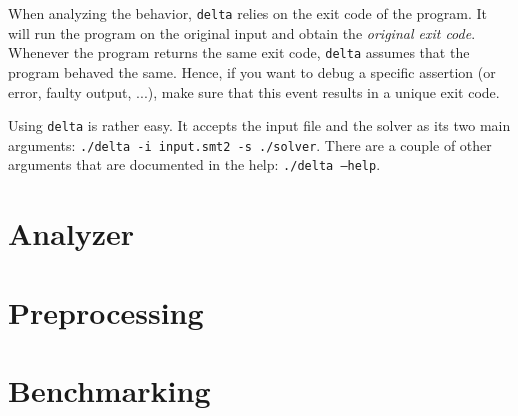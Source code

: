 When analyzing the behavior, \texttt{delta} relies on the exit code of the program.
It will run the program on the original input and obtain the \emph{original exit code}.
Whenever the program returns the same exit code, \texttt{delta} assumes that the program behaved the same.
Hence, if you want to debug a specific assertion (or error, faulty output, ...), make sure that this event results in a unique exit code.

Using \texttt{delta} is rather easy.
It accepts the input file and the solver as its two main arguments: \texttt{./delta -i input.smt2 -s ./solver}.
There are a couple of other arguments that are documented in the help: \texttt{./delta --help}.

\section{Analyzer}

\section{Preprocessing}

\section{Benchmarking}